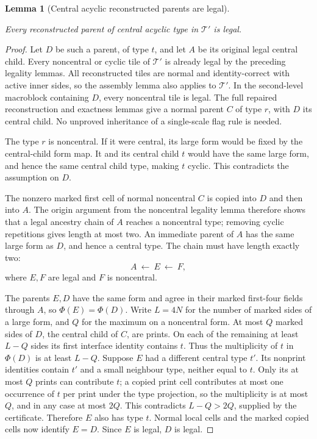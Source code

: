 \documentclass[11pt,a4paper]{article}
\newtheorem{lemma}[definition]{Lemma}
\theoremstyle{remark}
\newcommand{\lean}[1]{}
\newcommand{\uses}[1]{}
\begin{document}
\begin{lemma}[Central acyclic reconstructed parents are legal]
\label{lem:comp/acyclic-legal}
\lean{Tilings.Planned.reconstructed_acyclic_legal,Tilings.Planned.Strict.strict_reconstructed_acyclic_legal}
\uses{lem:comp/proper,lem:comp/exact,lem:comp/noncentral-legal,lem:comp/cyclic-legal,def:certificate}
Every reconstructed parent of central acyclic type in $\mathcal T'$ is legal.
\end{lemma}
\begin{proof}
Let $D$ be such a parent, of type $t$, and let $A$ be its original legal
central child. Every noncentral or cyclic tile of $\mathcal T'$ is already
legal by the preceding legality lemmas. All reconstructed tiles are normal
and identity-correct with active inner sides, so the assembly lemma also applies to
$\mathcal T'$. In the second-level macroblock containing $D$, every
noncentral tile is legal. The full repaired reconstruction and exactness
lemmas give a normal parent $C$ of type $r$, with $D$ its central child.
No unproved inheritance of a single-scale flag rule is needed.

The type $r$ is noncentral. If it were central, its large form would be
fixed by the central-child form map. It and its central child $t$ would
have the same large form, and hence the same central child type, making
$t$ cyclic. This contradicts the assumption on $D$.

The nonzero marked first cell of normal noncentral $C$ is copied into
$D$ and then into $A$. The origin argument from the noncentral legality
lemma therefore shows that a legal ancestry chain of $A$ reaches a
noncentral type; removing cyclic repetitions gives length at most two.
An immediate parent of $A$ has the same large form as $D$, and hence a
central type. The chain must have length exactly two:
\[
 A\ \longleftarrow\ E\ \longleftarrow\ F,
\]
where $E,F$ are legal and $F$ is noncentral.

The parents $E,D$ have the same form and agree in their marked first-four
fields through $A$, so $\Phi(E)=\Phi(D)$. Write $L=4N$ for the number
of marked sides of a large form, and $Q$ for the maximum on a noncentral
form. At most $Q$ marked sides of $D$, the central child of $C$, are prints.
On each of the remaining at least $L-Q$ sides its first interface identity
contains $t$. Thus the multiplicity of $t$ in $\Phi(D)$ is at least $L-Q$.
Suppose $E$ had a different central type $t'$. Its nonprint identities
contain $t'$ and a small neighbour type, neither equal to $t$. Only its
at most $Q$ prints can contribute $t$; a copied print cell contributes at
most one occurrence of $t$ per print under the type projection, so the
multiplicity is at most $Q$, and in any case at most $2Q$.
This contradicts $L-Q>2Q$, supplied by the certificate. Therefore $E$
also has type $t$. Normal local cells and the marked copied cells now
identify $E=D$. Since $E$ is legal, $D$ is legal.
\end{proof}
\end{document}
